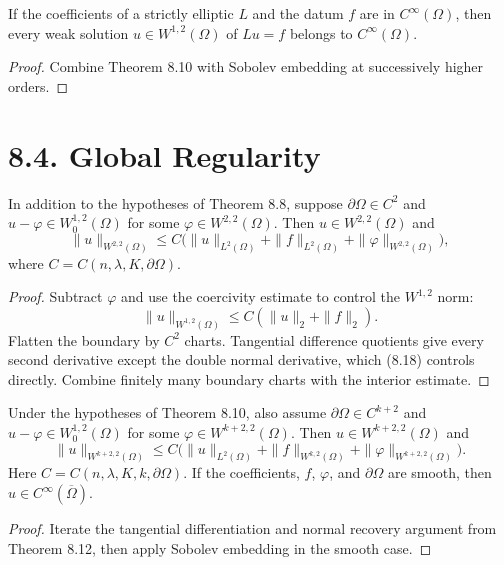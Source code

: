 \begin{corollary}
\label{gt-cor-8-11-interior-smoothness}
If the coefficients of a strictly elliptic $L$ and the datum $f$ are in
$C^\infty(\Omega)$, then every weak solution $u\in W^{1,2}(\Omega)$ of $Lu=f$
belongs to $C^\infty(\Omega)$.
\end{corollary}
\begin{proof}
\sketch Combine Theorem 8.10 with Sobolev embedding at successively higher orders.
\end{proof}

\section*{8.4. Global Regularity}

\begin{theorem}
\label{gt-thm-8-12-global-w22}
In addition to the hypotheses of Theorem 8.8, suppose
$\partial\Omega\in C^2$ and $u-\varphi\in W_0^{1,2}(\Omega)$ for some
$\varphi\in W^{2,2}(\Omega)$. Then $u\in W^{2,2}(\Omega)$ and
\begin{equation}
\|u\|_{W^{2,2}(\Omega)}\leq C\bigl(\|u\|_{L^2(\Omega)}
 +\|f\|_{L^2(\Omega)}+\|\varphi\|_{W^{2,2}(\Omega)}\bigr),
\tag{8.25}
\end{equation}
where $C=C(n,\lambda,K,\partial\Omega)$.
\end{theorem}
\begin{proof}
\sketch Subtract $\varphi$ and use the coercivity estimate to control the
$W^{1,2}$ norm:
\begin{equation}
\tag{8.26}
\|u\|_{W^{1,2}(\Omega)}
\leq C(\|u\|_2+\|f\|_2).
\end{equation}
Flatten the boundary by $C^2$ charts. Tangential difference
quotients give every second derivative except the double normal derivative,
which (8.18) controls directly. Combine finitely many boundary charts with the
interior estimate.
\end{proof}

\begin{theorem}
\label{gt-thm-8-13-higher-global-regularity}
Under the hypotheses of Theorem 8.10, also assume
$\partial\Omega\in C^{k+2}$ and
$u-\varphi\in W_0^{1,2}(\Omega)$ for some
$\varphi\in W^{k+2,2}(\Omega)$. Then $u\in W^{k+2,2}(\Omega)$ and
\begin{equation}
\|u\|_{W^{k+2,2}(\Omega)}\leq C\bigl(\|u\|_{L^2(\Omega)}
 +\|f\|_{W^{k,2}(\Omega)}+\|\varphi\|_{W^{k+2,2}(\Omega)}\bigr).
\tag{8.27}
\end{equation}
Here $C=C(n,\lambda,K,k,\partial\Omega)$. If the coefficients, $f$, $\varphi$,
and $\partial\Omega$ are smooth, then $u\in C^\infty(\overline\Omega)$.
\end{theorem}
\begin{proof}
\sketch Iterate the tangential differentiation and normal recovery argument from
Theorem 8.12, then apply Sobolev embedding in the smooth case.
\end{proof}

